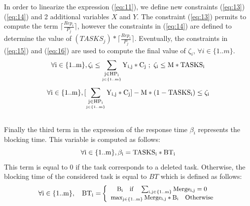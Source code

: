 \documentclass[runningheads,a4paper]{llncs}
\begin{document}
In order to linearize the expression (\ref{eq:11}), we define new constraints (\ref{eq:13})  (\ref{eq:14}) and 2 additional variables $X$ and $Y$. The constraint (\ref{eq:13}) permits to compute the term $\lceil \frac{Rep_i}{P_j}\rceil$, however the constraints in (\ref{eq:14}) are defined to determine the value of  $(TASKS_j)*\lceil \frac{Rep_i}{P_j}\rceil$. Eventually, the constraints in (\ref{eq:15}) and (\ref{eq:16}) are used to compute the final value of $\zeta_i$, $\forall i \in \{1..m\}$.  
\begin{equation}
\footnotesize{\mathrm{\forall{i \in \{1..m\}},  \zeta_i \leq \sum_{\underset{j \in \{1..m\}}{ j \in {HP_i}}} Y_ {i,j} *C_j }} \ ; \ \footnotesize{\mathrm{  \zeta_i \leq M*TASKS_i }}
\label{eq:15}
\end{equation}
\begin{equation}
\footnotesize{\mathrm{\forall{i \in \{1..m\}},[ \sum_{\underset{j \in \{1..m\}}{ j \in {HP_i}}} Y_ {i,j} *C_j] - M*(1-TASKS_i) \leq \zeta_i }}
\label{eq:16}
\end{equation}
\\Finally the third term in the expression of the response time $\beta_i$ represents the blocking time. This variable is computed as follows: 
\begin{equation}
\footnotesize{\mathrm{\forall{i \in \{1..m\}},  \beta_i = TASKS_i *BT_i }}
\label{eq:17}
\end{equation}
This term is equal to 0 if the task corresponds to a deleted task. Otherwise, the blocking time of the considered task is equal to $BT$ which is defined as follows: 
\begin{equation}
\footnotesize{\mathrm{\forall{i \in \{1..m\}}, \quad BT_i =}}
\left\lbrace
\begin{array}{ccc}
\footnotesize{\mathrm{B_i \quad if  \quad \sum_{i,j \in \{1..m\}} Merge_{i,j} =0}}\\
\footnotesize{\mathrm{\max_{j \in \{1..m\}} Merge_{i,j} * B_i   \quad Otherwise}}
\end{array}\right.
\label{eq:18}
\end{equation}
\end{document}
